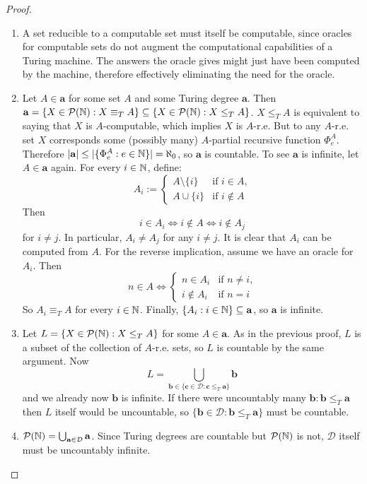 \documentclass[../main.tex]{memoir}
\begin{document}
\begin{proof}
  \begin{enumerate}
  \item A set reducible to a computable set must itself be computable, since oracles for computable sets do not augment the computational capabilities of a Turing machine. The answers the oracle gives might just have been computed by the machine, therefore effectively eliminating the need for the oracle.
  \item Let $A \in \mathbf{a}$ for some set $A$ and some Turing degree $\mathbf{a}$. Then $\mathbf{a} = \{X \in \mathcal{P}(\mathbb{N}): X \equiv_T A\} \subseteq \{X \in \mathcal{P}(\mathbb{N}): X \le_T A\}$. $X \le_T A$ is equivalent to saying that $X$ is $A$-computable, which implies $X$ is $A$-r.e. But to any $A$-r.e. set $X$ corresponds some (possibly many) $A$-partial recursive function $\Phi_e^A$. Therefore $|\mathbf{a}| \le |\{\Phi_e^A: e \in \mathbb{N}\}| = \aleph_0$, so $\mathbf{a}$ is countable. To see $\mathbf{a}$ is infinite, let $A \in \mathbf{a}$ again. For every $i \in \mathbb{N}$, define:
    \begin{equation*}
      A_i := \left\{
        \begin{array}{lr}
          A \setminus \{i\} & \text{if } i \in A \text{,} \\
          A \cup \{i\} & \text{if } i \not\in A
        \end{array}
      \right.
    \end{equation*}
    Then
    \[ i \in A_i \iff i \not\in A \iff i \not\in A_j \]
    for $i \neq j$. In particular, $A_i \neq A_j$ for any $i \neq j$. It is clear that $A_i$ can be computed from $A$. For the reverse implication, assume we have an oracle for $A_i$. Then
    \begin{equation*}
      n \in A \iff \left\{
        \begin{array}{lr}
          n \in A_i & \text{if } n \neq i \text{,} \\
          i \not\in A_i & \text{if } n = i
        \end{array}
      \right.
    \end{equation*}
    So $A_i \equiv_T A$ for every $i \in \mathbb{N}$. Finally, $\{A_i: i \in \mathbb{N}\} \subseteq \mathbf{a}$, so $\mathbf{a}$ is infinite.
  \item Let $L = \{X \in \mathcal{P}(\mathbb{N}): X \le_T A\}$ for some $A \in \mathbf{a}$. As in the previous proof, $L$ is a subset of the collection of $A$-r.e. sets, so $L$ is countable by the same argument. Now
    \[ L = \bigcup_{\mathbf{b} \in \{\mathbf{c} \in \mathbf{\mathcal{D}}: \mathbf{c} \le_T \mathbf{a}\}} \mathbf{b} \]
    and we already now $\mathbf{b}$ is infinite. If there were uncountably many $\mathbf{b}: \mathbf{b} \le_T \mathbf{a}$ then $L$ itself would be uncountable, so $\{\mathbf{b} \in \mathbf{\mathcal{D}}: \mathbf{b} \le_T \mathbf{a}\}$ must be countable.
  \item $\mathcal{P}(\mathbb{N}) = \bigcup_{\mathbf{a} \in \mathbf{\mathcal{D}}} \mathbf{a}$. Since Turing degrees are countable but $\mathcal{P}(\mathbb{N})$ is not, $\mathbf{\mathcal{D}}$ itself must be uncountably infinite.
  \end{enumerate}
\end{proof}
\end{document}
